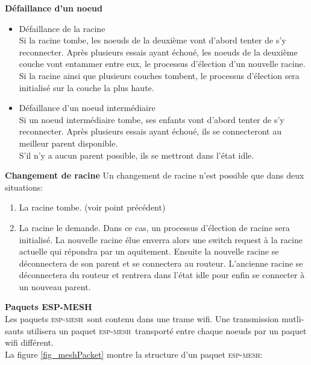 \documentclass[a4paper, 12pt]{report}
\newcommand{\espmesh}{\textsc{esp-mesh}}
\begin{document}
    \vspace{0.5cm}
    \textbf{Défaillance d'un noeud}\newline
        \begin{itemize}
            \item Défaillance de la racine\\
                Si la racine tombe, les noeuds de la deuxième vont d'abord tenter de s'y reconnecter.
                Après plusieurs essais ayant échoué, les noeuds de la deuxième couche vont entammer entre eux, le processus d'élection d'un nouvelle racine.\\
                Si la racine ainsi que plusieurs couches tombent, le processus d'élection sera initialisé sur la couche la plus haute.


            \item Défaillance d'un noeud intermédiaire\\
                Si un noeud intermédiaire tombe, ses enfants vont d'abord tenter de s'y reconnecter.
                Après plusieurs essais ayant échoué, ils se connecteront au meilleur parent disponible.\\
                S'il n'y a aucun parent possible, ils se mettront dans l'état idle.
        \end{itemize}
        \vspace{0.5cm}
        \textbf{Changement de racine}\newline
            Un changement de racine n'est possible que dans deux situations:
            \begin{enumerate}
                \item La racine tombe. (voir point précédent)
                \item La racine le demande.
                    Dans ce cas, un processus d'élection de racine sera initialisé. La nouvelle racine élue
                    enverra alors une switch request à la racine actuelle qui répondra par un aquitement.
                    Ensuite la nouvelle racine se déconnectera de son parent et se connectera au routeur.
                    L'ancienne racine se déconnectera du routeur et rentrera dans l'état idle pour enfin se connecter à un nouveau parent.
            \end{enumerate}
    \newpage
    \textbf{Paquets ESP-MESH}\\
        Les paquets \espmesh\ sont contenu dans une trame wifi. Une transmission mutli-sauts utilisera un paquet \espmesh\ transporté entre chaque noeuds par un paquet wifi différent.\\
        La figure \ref{fig_meshPacket} montre la structure d'un paquet \espmesh:\\
\end{document}
